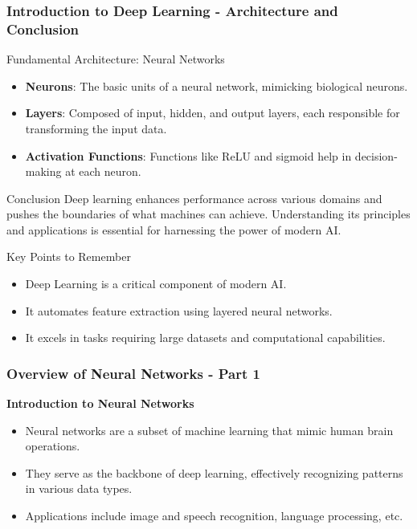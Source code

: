 \documentclass[aspectratio=169]{beamer}
\begin{document}
\begin{frame}[fragile]
    \frametitle{Introduction to Deep Learning - Architecture and Conclusion}
    \begin{block}{Fundamental Architecture: Neural Networks}
        \begin{itemize}
            \item \textbf{Neurons}: The basic units of a neural network, mimicking biological neurons.
            \item \textbf{Layers}: Composed of input, hidden, and output layers, each responsible for transforming the input data.
            \item \textbf{Activation Functions}: Functions like ReLU and sigmoid help in decision-making at each neuron.
        \end{itemize}
    \end{block}
    
    \begin{block}{Conclusion}
        Deep learning enhances performance across various domains and pushes the boundaries of what machines can achieve. 
        Understanding its principles and applications is essential for harnessing the power of modern AI.
    \end{block}
    
    \begin{block}{Key Points to Remember}
        \begin{itemize}
            \item Deep Learning is a critical component of modern AI.
            \item It automates feature extraction using layered neural networks.
            \item It excels in tasks requiring large datasets and computational capabilities.
        \end{itemize}
    \end{block}
\end{frame}

\begin{frame}[fragile]
    \frametitle{Overview of Neural Networks - Part 1}
    
    \textbf{Introduction to Neural Networks}
    
    \begin{itemize}
        \item Neural networks are a subset of machine learning that mimic human brain operations.
        \item They serve as the backbone of deep learning, effectively recognizing patterns in various data types.
        \item Applications include image and speech recognition, language processing, etc.
    \end{itemize}
\end{frame}
\end{document}
